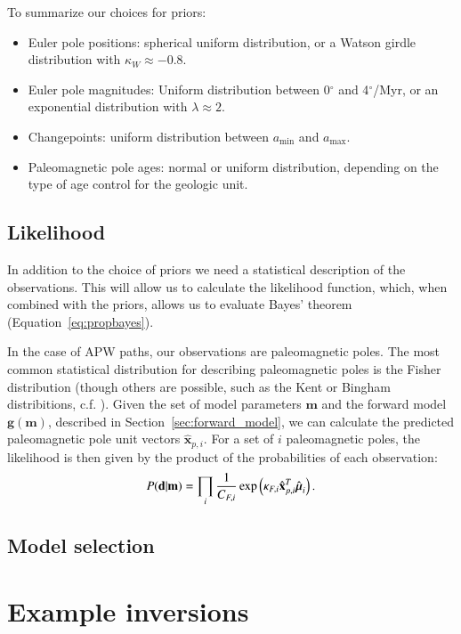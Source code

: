 \documentclass[preprint,12pt,authoryear]{elsarticle}
\newcommand{\mitbf}[1]{\hbox{\mathversion{bold}$#1$}}
\begin{document}
To summarize our choices for priors:
\begin{itemize}
\item Euler pole positions: spherical uniform distribution, or a Watson girdle distribution with $\kappa_W \approx -0.8$.
\item Euler pole magnitudes: Uniform distribution between 0$^\circ$ and 4$^\circ$/Myr, or an exponential distribution with $\lambda \approx 2$.
\item Changepoints: uniform distribution between $a_\mathrm{min}$ and $a_\mathrm{max}$.
\item Paleomagnetic pole ages: normal or uniform distribution, depending on the type of age control for the geologic unit.
\end{itemize}


\subsection{Likelihood}
\label{sec:likelihood}
In addition to the choice of priors we need a statistical description of the observations.
This will allow us to calculate the likelihood function, which, when combined with the priors,
allows us to evaluate Bayes' theorem (Equation~\eqref{eq:propbayes}).

In the case of APW paths, our observations are paleomagnetic poles.
The most common statistical distribution for describing paleomagnetic poles is the Fisher distribution
(though others are possible, such as the Kent or Bingham distribitions, c.f. \citet{tauxe2009essentials}).
Given the set of model parameters $\mathbf{m}$ and the forward model $\mathbf{g}(\mathbf{m})$, described
in Section~\ref{sec:forward_model}, we can calculate the predicted paleomagnetic pole unit vectors $\hat{\mathbf{x}}_{p,i}$.
For a set of $i$ paleomagnetic poles, the likelihood is then given by the product of the probabilities
of each observation:
\begin{equation}
P(\mathbf{d} \vert \mathbf{m}) = \displaystyle\prod_i \frac{1}{C_{F,i}} \exp \left( \kappa_{F,i} \hat{\mathbf{x}}_{p,i}^T \hat{\mitbf{\mu}}_i \right).
\label{eq:model_likelihood}
\end{equation}


\subsection{Model selection}

\section{Example inversions}
\label{sec:example_inversion}
\end{document}
